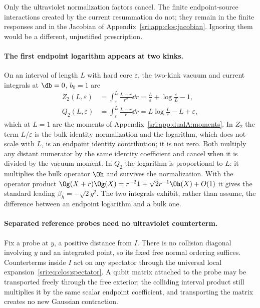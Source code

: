 Only the ultraviolet normalization factors cancel. The finite endpoint-source interactions created by the current
resummation do not; they remain in the finite responses and in the Jacobian of Appendix~\ref{sri:app:clos:jacobian}.
Ignoring them would be a different, unjustified prescription.

\paragraph{The first endpoint logarithm appears at two kinks.} On an interval of length $L$ with hard core
$\varepsilon$, the two-kink vacuum and current integrals at $\db=0$, $b_0=1$ are
\begin{align}
 Z_2(L,\varepsilon)&=\int_\varepsilon^L\frac{L-r}{r^2}\dd r=\frac L\varepsilon+\log\frac\varepsilon L-1,
 \label{sri:eq:clos:Z2}\\
 Q_2(L,\varepsilon)&=\int_\varepsilon^L\frac{L-r}{r}\dd r=L\log\frac L\varepsilon-L+\varepsilon,
 \label{sri:eq:clos:Q2}
\end{align}
which at $L=1$ are the moments of Appendix~\ref{sri:app:dualA:moments}. In $Z_2$ the term $L/\varepsilon$ is the bulk
identity normalization and the logarithm, which does not scale with $L$, is an endpoint identity contribution; it is
not zero. Both multiply any distant numerator by the same identity coefficient and cancel when it is divided by the
vacuum moment. In $Q_2$ the logarithm is proportional to $L$: it multiplies the bulk operator $\Oh$ and survives the
normalization. With the operator product $\Og(X+r)\Og(X)=r^{-2}\mathbf 1+\sqrt2r^{-1}\Oh(X)+O(1)$ it gives the
standard leading $\beta_h=-\sqrt2g^2$. The two integrals exhibit, rather than assume, the difference between an
endpoint logarithm and a bulk one.

\paragraph{Separated reference probes need no ultraviolet counterterm.} Fix a probe at $y$, a positive distance from
$I$. There is no collision diagonal involving $y$ and an integrated point, so its fixed free normal ordering suffices.
Counterterms inside $I$ act on any spectator through the universal local expansion~\eqref{sri:eq:clos:spectator}. A qubit
matrix attached to the probe may be transported freely through the free exterior; the colliding interval product still
multiplies it by the same scalar endpoint coefficient, and transporting the matrix creates no new Gaussian
contraction.


